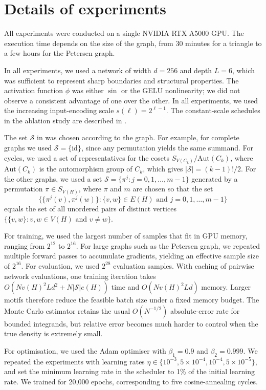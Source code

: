 \documentclass{article}
\theoremstyle{plain}
\theoremstyle{definition}
\theoremstyle{remark}
\begin{document}
\section{Details of experiments} \label{sec:experimentdetails}

All experiments were conducted on a single NVIDIA RTX A5000 GPU.
The execution time depends on the size of the graph, from 30 minutes for a triangle to a few hours for the Petersen graph.

In all experiments, we used a network of width $d=256$ and depth $L=6$, which was sufficient to represent sharp boundaries and structural properties.
The activation function $\phi$ was either $\sin$ or the GELU nonlinearity; we did not observe a consistent advantage of one over the other.
In all experiments, we used the increasing input-encoding scale $s(\ell)=2^{\ell-1}$. The constant-scale schedules in the ablation study are described in .

The set $\mathcal{S}$ in  was chosen according to the graph. For example, for complete graphs we used $\mathcal{S}=\{\mathrm{id}\}$, since any permutation yields the same summand.
For cycles, we used a set of representatives for the cosets $S_{V(C_k)} / \text{Aut}(C_k)$, where $\text{Aut}(C_k)$ is the automorphism group of $C_k$, which gives $|\mathcal{S}| = (k-1)! / 2$.
For the other graphs, we used a set $\mathcal{S}=\{\pi^j : j = 0, 1, \ldots, m-1\}$ generated by a permutation $\pi \in S_{V(H)}$, where $\pi$ and $m$ are chosen so that the set
\[
  \{\{\pi^j(v), \pi^j(w)\} : \{v, w\} \in E(H) \text{ and } j = 0, 1, \ldots, m-1\}
\]
equals the set of all unordered pairs of distinct vertices $\{\{v, w\} : v, w \in V(H) \text{ and } v \neq w\}$.

For training, we used the largest number of samples that fit in GPU memory, ranging from $2^{12}$ to $2^{16}$.
For large graphs such as the Petersen graph, we repeated multiple forward passes to accumulate gradients, yielding an effective sample size of $2^{16}$.
For evaluation, we used $2^{28}$ evaluation samples.
With caching of pairwise network evaluations, one training iteration takes $O(Nv(H)^2Ld^2 + N|\mathcal{S}|e(H))$ time and $O(Nv(H)^2Ld)$ memory. Larger motifs therefore reduce the feasible batch size under a fixed memory budget. The Monte Carlo estimator retains the usual $O(N^{-1/2})$ absolute-error rate for bounded integrands, but relative error becomes much harder to control when the true density is extremely small.

For optimisation, we used the Adam optimiser with $\beta_1=0.9$ and $\beta_2=0.999$.
We repeated the experiments with learning rates $\eta \in \{10^{-3}, 5 \times 10^{-4}, 10^{-4}, 5 \times 10^{-5}\}$, and set the minimum learning rate in the scheduler to 1\% of the initial learning rate.
We trained for 20,000 epochs, corresponding to five cosine-annealing cycles.
\end{document}
